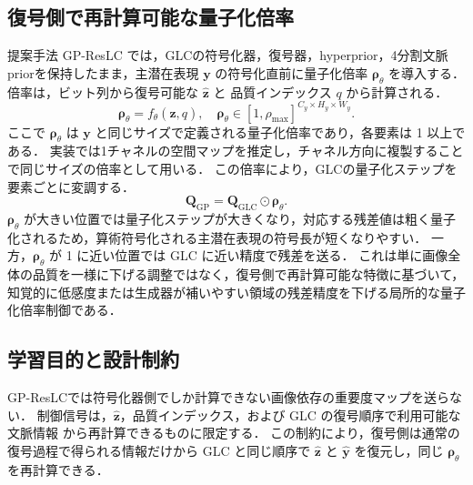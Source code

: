 \documentclass[MIRU,submit]{miru2026j}
\begin{document}
\subsection{復号側で再計算可能な量子化倍率}
提案手法 GP-ResLC では，GLCの符号化器，復号器，hyperprior，4分割文脈priorを保持したまま，主潜在表現 $\mathbf{y}$ の符号化直前に量子化倍率 $\boldsymbol{\rho}_\theta$ を導入する．
倍率は，ビット列から復号可能な $\hat{\mathbf{z}}$ と 品質インデックス $q$ から計算される．
\begin{equation}
\boldsymbol{\rho}_\theta = f_\theta(\hat{\mathbf{z}}, q), \quad
\boldsymbol{\rho}_\theta \in [1,\rho_{\max}]^{C_y \times H_y \times W_y} .
\end{equation}
ここで $\boldsymbol{\rho}_\theta$ は $\mathbf{y}$ と同じサイズで定義される量子化倍率であり，各要素は 1 以上である．
実装では1チャネルの空間マップを推定し，チャネル方向に複製することで同じサイズの倍率として用いる．
この倍率により，GLCの量子化ステップを要素ごとに変調する．
\begin{equation}
\mathbf{Q}_{\mathrm{GP}} = \mathbf{Q}_{\mathrm{GLC}} \odot \boldsymbol{\rho}_\theta .
\end{equation}
$\boldsymbol{\rho}_\theta$ が大きい位置では量子化ステップが大きくなり，対応する残差値は粗く量子化されるため，算術符号化される主潜在表現の符号長が短くなりやすい．
一方，$\boldsymbol{\rho}_\theta$ が 1 に近い位置では GLC に近い精度で残差を送る．
これは単に画像全体の品質を一様に下げる調整ではなく，復号側で再計算可能な特徴に基づいて，知覚的に低感度または生成器が補いやすい領域の残差精度を下げる局所的な量子化倍率制御である．

\subsection{学習目的と設計制約}
GP-ResLCでは符号化器側でしか計算できない画像依存の重要度マップを送らない．
制御信号は，$\hat{\mathbf{z}}$，品質インデックス，および GLC の復号順序で利用可能な文脈情報 から再計算できるものに限定する．
この制約により，復号側は通常の復号過程で得られる情報だけから GLC と同じ順序で $\hat{\mathbf{z}}$ と $\hat{\mathbf{y}}$ を復元し，同じ $\boldsymbol{\rho}_\theta$ を再計算できる．
\end{document}
